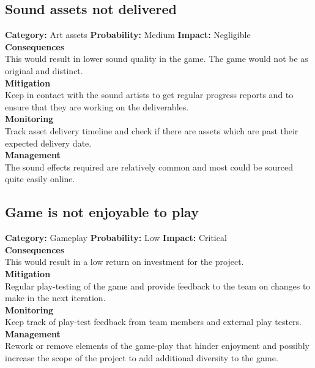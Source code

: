 \documentclass[a4paper,10pt]{article}
\begin{document}
		\subsection{Sound assets not delivered}
		\textbf{Category:} Art assets\newline
		\textbf{Probability:} Medium\newline
		\textbf{Impact:} Negligible
		\\\textbf{Consequences}\\
		This would result in lower sound quality in the game. The game would not be as original and distinct.
		\smallskip\\\textbf{Mitigation}\\
		Keep in contact with the sound artists to get regular progress reports and to ensure that they are working on the deliverables.
		\smallskip\\\textbf{Monitoring}\\
		Track asset delivery timeline and check if there are assets which are past their expected delivery date.
		\smallskip\\\textbf{Management}\\
		The sound effects required are relatively common and most could be sourced quite easily online.

		\subsection{Game is not enjoyable to play}
		\textbf{Category:} Gameplay\newline
		\textbf{Probability:} Low\newline
		\textbf{Impact:} Critical
		\\\textbf{Consequences}\\
		This would result in a low return on investment for the project.
		\smallskip\\\textbf{Mitigation}\\
		Regular play-testing of the game and provide feedback to the team on changes to make in the next iteration.
		\smallskip\\\textbf{Monitoring}\\
		Keep track of play-test feedback from team members and external play testers.
		\smallskip\\\textbf{Management}\\
		Rework or remove elements of the game-play that hinder enjoyment and possibly increase the scope of the project to add additional diversity to the game.
\end{document}
